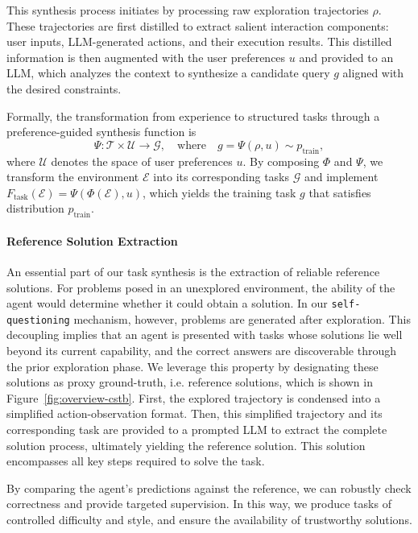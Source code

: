 This synthesis process initiates by processing raw exploration trajectories $\rho$. These trajectories are first distilled to extract salient interaction components: user inputs, LLM-generated actions, and their execution results. This distilled information is then augmented with the user preferences $u$ and provided to an LLM, which analyzes the context to synthesize a candidate query $g$ aligned with the desired constraints.

Formally, the transformation from experience to structured tasks through a preference-guided synthesis function is
\begin{equation}
    \Psi: \mathcal{T} \times \mathcal{U} \to \mathcal{G}, \quad \text{where} \quad g = \Psi\left(\rho, u\right) \sim p_\mathrm{train},
\end{equation}
where $\mathcal{U}$ denotes the space of user preferences $u$. By composing $\Phi$ and $\Psi$, we transform the environment $\mathcal E$ into its corresponding tasks $\mathcal G$ and implement $F_{\mathrm{task}}(\mathcal E) = \Psi(\Phi(\mathcal E),u)$, which yields the training task $g$ that satisfies distribution $p_{\mathrm{train}}$.

\paragraph{Reference Solution Extraction}

An essential part of our task synthesis is the extraction of reliable reference solutions. For problems posed in an unexplored environment, the ability of the agent would determine whether it could obtain a solution. In our \texttt{self-questioning} mechanism, however, problems are generated after exploration. This decoupling implies that an agent is presented with tasks whose solutions lie well beyond its current capability, and the correct answers are discoverable through the prior exploration phase. We leverage this property by designating these solutions as proxy ground-truth, i.e. reference solutions, which is shown in Figure~\ref{fig:overview-cstb}.
First, the explored trajectory is condensed into a simplified action-observation format. Then, this simplified trajectory and its corresponding task are provided to a prompted LLM to extract the complete solution process, ultimately yielding the reference solution. This solution encompasses all key steps required to solve the task.

By comparing the agent's predictions against the reference, we can robustly check correctness and provide targeted supervision.
In this way, we produce tasks of controlled difficulty and style, and ensure the availability of trustworthy solutions.


